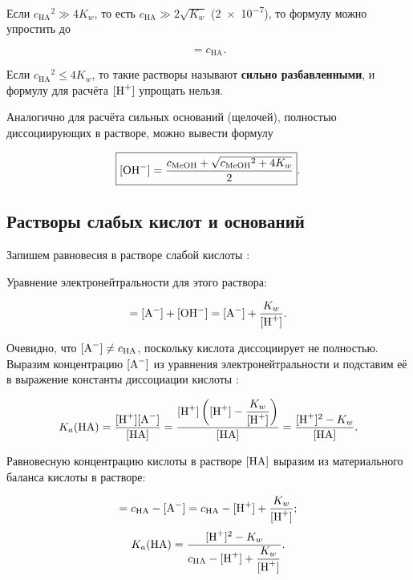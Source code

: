 Если ${c_{\text{HA}}}^2 \gg 4K_w$, то есть $c_{\text{HA}} \gg 2\sqrt{K_w}$ (\qty{2e-7}{\ruMolar}), то формулу можно упростить до

\begin{equation*}
    [\ce{H^+}] = c_{\text{HA}}.
\end{equation*}

Если ${c_{\text{HA}}}^2 \leqslant 4K_w$, то такие растворы называют \textbf{сильно разбавленными}, и формулу для расчёта $[\ce{H^+}]$ упрощать нельзя.

Аналогично для расчёта сильных оснований (щелочей), полностью диссоциирующих в растворе, можно вывести формулу

\begin{equation*}
    \boxed{[\ce{OH^-}] = \frac{c_{\text{MeOH}} + \sqrt{{c_{\text{MeOH}}}^2 + 4K_w}}{2}}.
\end{equation*}

\subsection*{Растворы слабых кислот и оснований}

Запишем равновесия в растворе слабой кислоты :


Уравнение электронейтральности для этого раствора:

\begin{equation*}
    [\ce{H^+}] = [\ce{A^-}] + [\ce{OH^-}] = [\ce{A^-}] + \frac{K_w}{[\ce{H^+}]}.
\end{equation*}

Очевидно, что $[\ce{A^-}] \neq c_{\text{HA}}$, поскольку кислота диссоциирует не полностью. Выразим концентрацию $[\ce{A^-}]$ из уравнения электронейтральности и подставим её в выражение константы диссоциации кислоты :

\begin{equation*}
    K_a(\text{HA})
    = \frac{[\ce{H^+}][\ce{A^-}]}{[\ce{HA}]}
    = \dfrac{[\ce{H^+}]\left([\ce{H^+}] - \dfrac{K_w}{[\ce{H^+}]}\right)}{[\ce{HA}]}
    = \frac{[\ce{H^+}]^2 - K_w}{[\ce{HA}]}.
\end{equation*}

Равновесную концентрацию кислоты в растворе $[\ce{HA}]$ выразим из материального баланса кислоты  в растворе:

\begin{equation*}
    [\ce{HA}]
    = c_{\text{HA}} - [\ce{A^-}]
    = c_{\text{HA}} - [\ce{H^+}] + \frac{K_w}{[\ce{H^+}]};
\end{equation*}
\begin{equation*}
    K_a(\text{HA})
    = \dfrac{[\ce{H^+}]^2 - K_w}{c_{\text{HA}} - [\ce{H^+}] + \dfrac{K_w}{[\ce{H^+}]}}.
\end{equation*}

